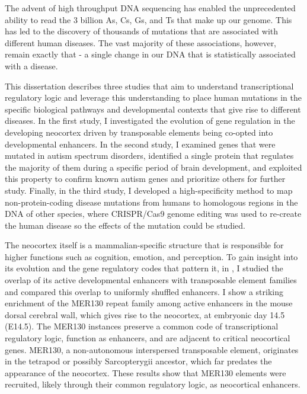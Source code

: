 The advent of high throughput DNA sequencing has enabled the unprecedented  ability to read the 3 billion As, Cs, Gs, and Ts that make up our genome. This has led to the discovery of thousands of mutations that are  associated with different human diseases. The vast majority of these associations, however, remain exactly that - a single change in our DNA that is statistically associated with a disease. 

This dissertation describes three studies that aim to understand transcriptional regulatory logic and leverage this understanding to place human mutations in the specific  biological pathways and developmental contexts that give rise to different diseases. In the first study, I investigated the evolution of gene regulation in the developing neocortex driven by transposable elements being co-opted into developmental enhancers. In the second study, I examined genes that were mutated in autism spectrum disorders, identified a single protein that regulates the majority of them during a specific period of brain development, and exploited this property to confirm known autism genes and prioritize others for further study. Finally, in the third study, I developed a high-specificity method to map non-protein-coding disease mutations from humans to homologous regions in the DNA of other species, where CRISPR/Cas9 genome editing was used to re-create the human disease so the effects of the mutation could be studied.

The neocortex itself is a mammalian-specific structure that is responsible for higher functions such as cognition, emotion, and perception. To gain insight into its evolution and the gene regulatory codes that pattern it, in , I studied the overlap of its active developmental enhancers with transposable element families and compared this overlap to uniformly shuffled enhancers. I show a striking enrichment of the MER130 repeat family among active enhancers in the mouse dorsal cerebral wall, which gives rise to the neocortex, at embryonic day 14.5 (E14.5). The MER130 instances preserve a common code of transcriptional regulatory logic, function as enhancers, and are adjacent to critical neocortical genes. MER130, a non-autonomous interspersed transposable element, originates in the tetrapod or possibly Sarcopterygii ancestor, which far predates the appearance of the neocortex. These results show that MER130 elements were recruited, likely through their common regulatory logic, as neocortical enhancers.


